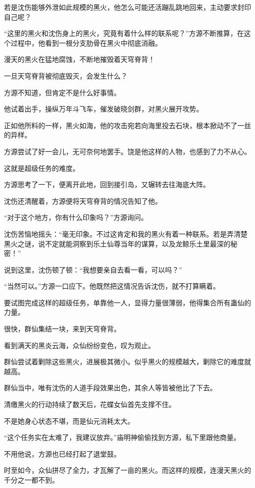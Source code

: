 \begin{this_body}
若是沈伤能够外泄如此规模的黑火，他怎么可能还活蹦乱跳地回来，主动要求封印自己呢？

“这里的黑火和沈伤身上的黑火，究竟有着什么样的联系呢？”方源不断推算，在这个过程中，他看到一根分支肋骨在黑火中彻底消融。

漫天的黑火在猛地腐蚀，不断地摧毁着天穹脊背！

一旦天穹脊背被彻底毁灭，会发生什么？

方源不知道，但肯定不是什么好事情。

他试着出手，操纵万年斗飞车，催发破晓剑群，对黑火展开攻势。

正如他所料的一样，黑火如海，他的攻击宛若向海里投去石块，根本掀动不了一丝的异样。

方源尝试了好一会儿，无可奈何地罢手。饶是他这样的人物，也感到了力不从心。

这就是超级任务的难度。

方源思考了一下，便离开此地，回到接引岛，又辗转去往海底大阵。

沈伤还清醒着，方源便将天穹脊背的情况告知了他。

“对于这个地方，你有什么印象吗？”方源询问。

沈伤苦恼地摇头：“毫无印象。不过这肯定和我的黑火有着一种联系。若是弄清楚黑火之谜，说不定就能洞察到乐土仙尊当年的谋算，以及龙鲸乐土里最深的秘密！”

说到这里，沈伤顿了顿：“我想要亲自去看一看，可以吗？”

“当然可以。”方源一口应下。他既然把这情况告诉沈伤，就不打算瞒着。

要试图完成这样的超级任务，单靠他一人，显得力量很薄弱，他得集合所有蛊仙的力量。

很快，群仙集结一块，来到天穹脊背。

看到满天的黑炎云海，众仙纷纷变色，叹为观止。

群仙尝试着剿除这些黑火，进展极其微小。似乎黑火的规模越大，剿除它的难度就越高。

群仙当中，唯有沈伤的人道手段效果出色，其余人等皆被他比了下去。

清缴黑火的行动持续了数天后，花蝶女仙首先支撑不住。

不是她身心状态不堪，而是仙元消耗太大。

“这个任务实在太难了，我建议放弃。”庙明神偷偷找到方源，私下里跟他商量。

不用他说，方源也已经打起了退堂鼓。

时至如今，众仙拼尽了全力，才瓦解了一亩的黑火。而这样的规模，连漫天黑火的千分之一都不到。


\end{this_body}
